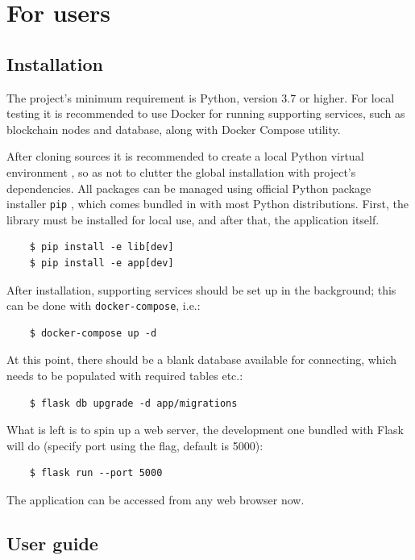 \chapter{For users}

\section{Installation}

The project's minimum requirement is Python, \cite{python} version 3.7 or higher.
For local testing it is recommended to use Docker \cite{docker} for running
supporting services, such as blockchain nodes and database,
along with Docker Compose utility.

After cloning sources it is recommended to create a local Python
virtual environment \cite{venv}, so as not to clutter the global installation with project's
dependencies.
All packages can be managed
using official Python package installer \texttt{pip} \cite{pip},
which comes bundled in with most Python distributions.
First, the library must be installed for local use,
and after that, the application itself.
\begin{verbatim}
    $ pip install -e lib[dev]
    $ pip install -e app[dev]
\end{verbatim}

After installation, supporting services should be set up in the background;
this can be done with \texttt{docker-compose}, i.e.:
\begin{verbatim}
    $ docker-compose up -d
\end{verbatim}

At this point, there should be a blank database available for connecting,
which needs to be populated with required tables etc.:
\begin{verbatim}
    $ flask db upgrade -d app/migrations
\end{verbatim}

What is left is to spin up a web server,
the development one bundled with Flask will do
(specify port using the flag, default is 5000):
\begin{verbatim}
    $ flask run --port 5000
\end{verbatim}

The application can be accessed from any web browser now.

\section{User guide}

